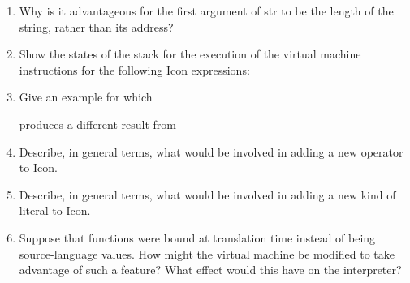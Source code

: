 \liststyleLvi
\begin{enumerate}
\item Why is it advantageous for the first argument of str to be the
length of the string, rather than its address?

\item Show the states of the stack for the execution of the virtual
machine instructions for the following Icon expressions:


\item Give an example for which


produces a different result from


\item Describe, in general terms, what would be involved in adding a
new operator to Icon.

\item Describe, in general terms, what would be involved in adding a
new kind of literal to Icon.

\item Suppose that functions were bound at translation time instead of
being source-language values. How might the virtual machine be
modified to take advantage of such a feature?  What effect would this
have on the interpreter?

\end{enumerate}
